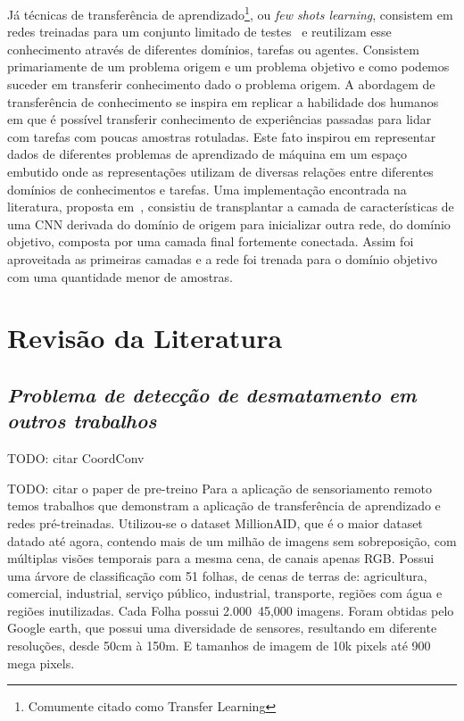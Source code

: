 Já técnicas de transferência de aprendizado\footnote{Comumente citado como Transfer Learning}, ou \textit{few shots learning}, consistem em redes treinadas para um conjunto limitado de testes~\cite{rostami2019learning}
e reutilizam esse conhecimento através de diferentes domínios, tarefas ou agentes. Consistem primariamente de um problema origem e um problema objetivo e como podemos suceder em transferir conhecimento dado o problema origem. A abordagem de transferência de conhecimento se inspira em replicar a habilidade dos humanos em que é possível transferir conhecimento de experiências passadas para lidar com tarefas com poucas amostras rotuladas. Este fato inspirou em representar dados de diferentes problemas de aprendizado de máquina em um espaço embutido onde as representações utilizam de diversas relações entre diferentes domínios de conhecimentos e tarefas. Uma implementação encontrada na literatura, proposta em~\cite{DBLP:journals/corr/abs-1811-04863}, consistiu de transplantar a camada de características de uma CNN derivada do domínio de origem para inicializar outra rede, do domínio objetivo, composta por uma camada final fortemente conectada. Assim foi aproveitada as primeiras camadas e a rede foi trenada para o domínio objetivo com uma quantidade menor de amostras. 



\section{Revisão da Literatura}\label{sec:Cap2_revisao_literatura}


\subsection{\textit{Problema de detecção de desmatamento em outros trabalhos}}\label{sec:Cap2_outros_trabalhos}





TODO: citar CoordConv


TODO: citar o paper de pre-treino
Para a aplicação de sensoriamento remoto temos trabalhos \cite{DBLP:journals/corr/abs-1811-04863} que demonstram a aplicação de transferência de aprendizado e redes pré-treinadas. Utilizou-se o dataset MillionAID, que é o maior dataset datado até agora, contendo mais de um milhão de imagens sem sobreposição, com múltiplas visões temporais para a mesma cena, de canais apenas RGB. Possui uma árvore de classificação com 51 folhas, de cenas de terras de: agricultura, comercial, industrial, serviço público, industrial, transporte, regiões com água e regiões inutilizadas. Cada Folha possui 2.000~45,000 imagens. Foram obtidas pelo Google earth, que possui uma diversidade de sensores, resultando em diferente resoluções, desde 50cm à 150m. E tamanhos de imagem de 10k pixels até 900 mega pixels.


